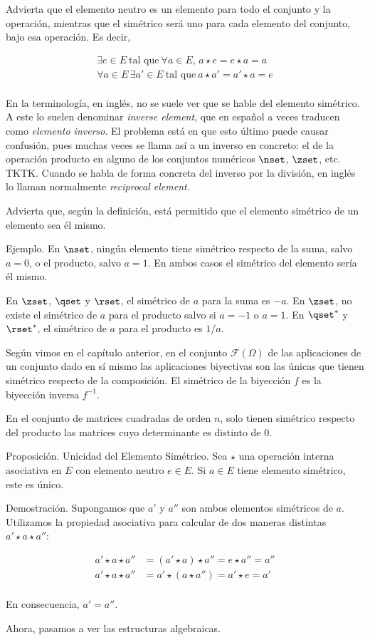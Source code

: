 Advierta que el elemento neutro es un elemento para todo el conjunto y la
operación, mientras que el simétrico será uno para cada elemento del
conjunto, bajo esa operación. Es decir,

\begin{align*}
  \exists e \in E \ \text{tal que} \ \forall a \in E, \, a \star e = e \star
    a = a \\
  \forall a \in E \, \exists a' \in E \ \text{tal que} \ a \star a' = a'
    \star a = e \\
\end{align*}

En la terminología, en inglés, no se suele ver que se hable del elemento
simétrico. A este lo suelen denominar \emph{inverse element}, que en español
a veces traducen como \emph{elemento inverso}. El problema está en que esto
último puede causar confusión, pues muchas veces se llama así a un inverso
en concreto: el de la operación producto en alguno de los conjuntos
numéricos $\nset$, $\zset$, etc. TKTK. Cuando se habla de forma concreta del
inverso por la división, en inglés lo llaman normalmente \emph{reciprocal
element}.

Advierta que, según la definición, está permitido que el elemento simétrico
de un elemento sea él mismo.

Ejemplo. En $\nset$, ningún elemento tiene simétrico respecto de la suma,
salvo $a = 0$, o el producto, salvo $a = 1$. En ambos casos el simétrico del
elemento sería él mismo.

En $\zset$, $\qset$ y $\rset$, el simétrico de $a$ para la suma es ${-a}$.
En $\zset$, no existe el simétrico de $a$ para el producto salvo si $a =
{-1}$ o $a = 1$. En $\qset^*$ y $\rset^*$, el simétrico de $a$ para el
producto es $1/a$.

Según vimos en el capítulo anterior, en el conjunto $\mathcal{F}(\Omega)$ de
las aplicaciones de un conjunto dado en sí mismo las aplicaciones biyectivas
son las únicas que tienen simétrico respecto de la composición. El simétrico
de la biyección $f$ es la biyección inversa $f^{-1}$.

En el conjunto de matrices cuadradas de orden $n$, solo tienen simétrico
respecto del producto las matrices cuyo determinante es distinto de $0$.

Proposición. Unicidad del Elemento Simétrico. Sea $\star$ una operación
interna asociativa en $E$ con elemento neutro $e \in E$. Si $a \in E$ tiene
elemento simétrico, este es único.

Demostración. Supongamos que $a'$ y $a''$ son ambos elementos simétricos de
$a$. Utilizamos la propiedad asociativa para calcular de dos maneras
distintas $a' \star a \star a''$:

\begin{align*}
  a' \star a \star a''  &= (a' \star a) \star a'' = e \star a'' = a'' \\
  a' \star a \star a''  &= a' \star (a \star a'') = a' \star e = a' \\
\end{align*}

\noindent En consecuencia, $a' = a''$.

Ahora, pasamos a ver las estructuras algebraicas.




